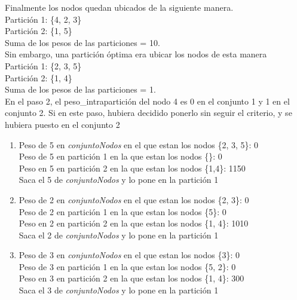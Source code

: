\noindent Finalmente los nodos quedan ubicados de la siguiente manera.\\
Partición 1: \{4, 2, 3\}\\
Partición 2: \{1, 5\}\\
Suma de los pesos de las particiones = 10.\\

\noindent Sin embargo, una partición óptima era ubicar los nodos de esta manera\\
Partición 1: \{2, 3, 5\}\\
Partición 2: \{1, 4\}\\
Suma de los pesos de las particiones = 1.\\

En el paso 2, el peso\_intrapartición del nodo 4 es 0 en el conjunto 1 y 1 en el conjunto 2. Si en este paso, hubiera decidido ponerlo sin seguir el criterio, y se hubiera puesto en el conjunto 2

\begin{enumerate}
\item
Peso de 5 en \textit{conjuntoNodos} en el que estan los nodos \{2, 3, 5\}: 0\\
Peso de 5 en partición 1 en la que estan los nodos \{\}: 0 \\
Peso en 5 en partición 2 en la que estan los nodos \{1,4\}: 1150 \\

Saca el 5 de \textit{conjuntoNodos} y lo pone en la partición 1\\

\item
Peso de 2 en \textit{conjuntoNodos} en el que estan los nodos \{2, 3\}: 0\\
Peso de 2 en partición 1 en la que estan los nodos \{5\}: 0 \\
Peso en 2 en partición 2 en la que estan los nodos \{1, 4\}: 1010 \\

Saca el 2 de \textit{conjuntoNodos} y lo pone en la partición 1\\

\item
Peso de 3 en \textit{conjuntoNodos} en el que estan los nodos \{3\}: 0\\
Peso de 3 en partición 1 en la que estan los nodos \{5, 2\}: 0 \\
Peso en 3 en partición 2 en la que estan los nodos \{1, 4\}: 300 \\

Saca el 3 de \textit{conjuntoNodos} y lo pone en la partición 1\\
\end{enumerate}


